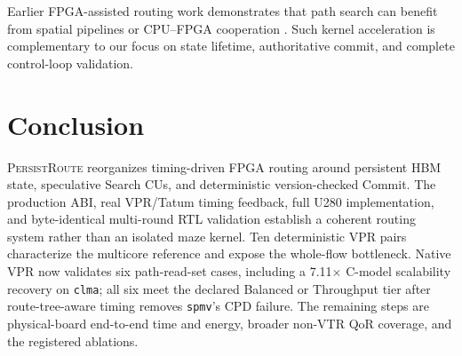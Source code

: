 \documentclass[sigconf,anonymous,review]{acmart}
\newcommand{\system}{\textsc{PersistRoute}}
\begin{document}
Earlier FPGA-assisted routing work demonstrates that path search can benefit
from spatial pipelines or CPU--FPGA cooperation \cite{korolija2019fpga}. Such
kernel acceleration is complementary to our focus on state lifetime,
authoritative commit, and complete control-loop validation.

\section{Conclusion}

\system{} reorganizes timing-driven FPGA routing around persistent HBM state,
speculative Search CUs, and deterministic version-checked Commit. The
production ABI, real VPR/Tatum timing feedback, full U280 implementation, and
byte-identical multi-round RTL validation establish a coherent routing system
rather than an isolated maze kernel. Ten deterministic VPR pairs characterize
the multicore reference and expose the whole-flow bottleneck. Native VPR now
validates six path-read-set cases, including a 7.11$\times$ C-model scalability
recovery on \texttt{clma}; all six meet the declared Balanced or Throughput
tier after route-tree-aware timing removes \texttt{spmv}'s CPD failure. The
remaining steps are physical-board end-to-end time and
energy, broader non-VTR QoR coverage, and the registered ablations.

\clearpage


\end{document}
